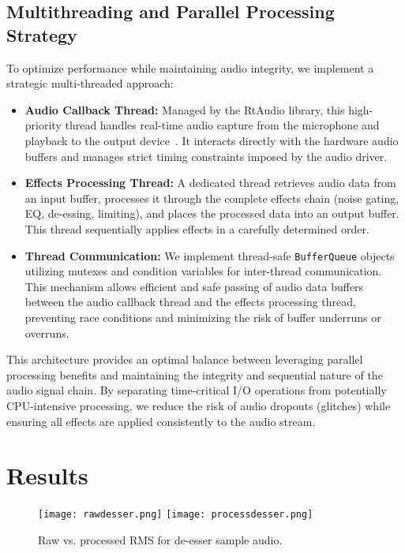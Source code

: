 \documentclass[conference]{IEEEtran}
\begin{document}
\subsection*{Multithreading and Parallel Processing Strategy}
To optimize performance while maintaining audio integrity, we implement a strategic multi-threaded approach:
\begin{itemize}
    \item \textbf{Audio Callback Thread:} Managed by the RtAudio library, this high-priority thread handles real-time audio capture from the microphone and playback to the output device~\cite{scavone2002}. It interacts directly with the hardware audio buffers and manages strict timing constraints imposed by the audio driver.
    \item \textbf{Effects Processing Thread:} A dedicated thread retrieves audio data from an input buffer, processes it through the complete effects chain (noise gating, EQ, de-essing, limiting), and places the processed data into an output buffer. This thread sequentially applies effects in a carefully determined order.
    \item \textbf{Thread Communication:} We implement thread-safe \texttt{BufferQueue} objects utilizing mutexes and condition variables for inter-thread communication. This mechanism allows efficient and safe passing of audio data buffers between the audio callback thread and the effects processing thread, preventing race conditions and minimizing the risk of buffer underruns or overruns.
\end{itemize}
This architecture provides an optimal balance between leveraging parallel processing benefits and maintaining the integrity and sequential nature of the audio signal chain. By separating time-critical I/O operations from potentially CPU-intensive processing, we reduce the risk of audio dropouts (glitches) while ensuring all effects are applied consistently to the audio stream.



\section{Results}

\begin{figure}[htbp]
    \centering
    \texttt{[image: rawdesser.png]}
    \texttt{[image: processdesser.png]}
    \caption{Raw vs. processed RMS for de-esser sample audio.}
    \label{fig:figure1}
\end{figure}
\end{document}
